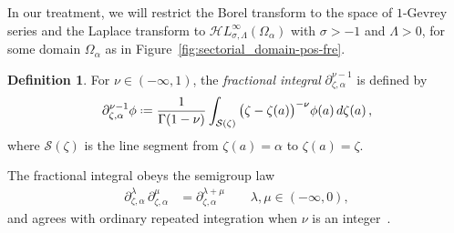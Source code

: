 \documentclass{article}
\newcommand{\singexp}[2]{\mathcal{H}L^\infty_{#1, #2}}
\newcommand{\fracderiv}[3]{\partial^{#1}_{#2, #3}}
\newcommand*{\defeq}{\mathrel{\vcenter{\baselineskip0.5ex \lineskiplimit0pt
                     \hbox{\scriptsize.}\hbox{\scriptsize.}}}%
                     =}
\theoremstyle{definition}
\newtheorem{definition}{Definition}[section]
\theoremstyle{plain}
\begin{document}
In our treatment, we will restrict the Borel transform to the space of $1$-Gevrey series and the Laplace transform to $\singexp{\sigma}{\Lambda}(\Omega_\alpha)$ with $\sigma>-1$ and $\Lambda>0$, for some domain $\Omega_\alpha$ as in Figure~\ref{fig:sectorial_domain-pos-fre}.
\begin{definition}
For $\nu \in (-\infty, 1)$, the \textit{fractional integral} $\partial^{\nu-1}_{\zeta, \alpha}$ is defined by
%
\[ \partial^{\nu-1}_{\zeta, \alpha} \phi \defeq \frac{1}{\Gamma(1-\nu)} \int_{\mathcal{S}(\zeta)} \big(\zeta-\zeta(a)\big)^{-\nu} \phi(a) \,d\zeta(a)\,, \]
where $\mathcal{S}(\zeta)$ is the line segment from $\zeta(a)=\alpha$ to $\zeta(a)=\zeta$.


\end{definition}
The fractional integral obeys the semigroup law \cite[Section  1.3]{mladenov2014advanced}
\begin{align*}
\fracderiv{\lambda}{\zeta}{\alpha}\,\fracderiv{\mu}{\zeta}{\alpha} & = \fracderiv{\lambda+\mu}{\zeta}{\alpha} \qquad \lambda, \mu \in (-\infty, 0),
\end{align*}
and agrees with ordinary repeated integration when $\nu$ is an integer~\cite[Equation 35]{mladenov2014advanced}.
\end{document}
